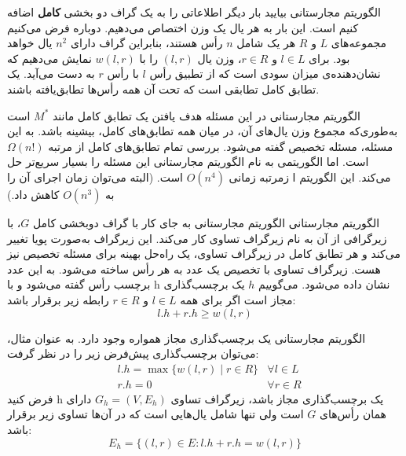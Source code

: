 \begin{itemframe}{الگوریتم مجارستانی}
\itm
بیایید بار دیگر اطلاعاتی را به یک گراف دو بخشی \textbf{کامل} اضافه کنیم است.
این بار به هر یال یک وزن اختصاص می‌دهیم.
دوباره فرض می‌کنیم مجموعه‌های $L$ و $R$ هر یک شامل $n$ رأس هستند، بنابراین گراف دارای
$n^2$
یال خواهد بود.
\itm
برای $l \in L$ و $r \in R$، وزن یال $(l, r)$ را با $w(l, r)$ نمایش می‌دهیم که نشان‌دهنده‌ی میزان سودی است که از تطبیق رأس $l$ با رأس $r$ به دست می‌آید.
\itm
یک تطابق کامل
 تطابقی است که تحت آن همه رأس‌ها تطابق‌یافته باشند.

\end{itemframe}


\begin{itemframe}{الگوریتم مجارستانی}
\itm
در این مسئله هدف یافتن یک تطابق کامل مانند
$M^*$
 است به‌طوری‌که مجموع وزن یال‌های آن، در میان همه تطابق‌های کامل، بیشینه باشد.
به این مسئله،‌ مسئله تخصیص
 گفته می‌شود.
\itm
بررسی تمام تطابق‌های کامل از مرتبه
$ \Omega (n!)$
است. اما الگوریتمی به نام الگوریتم مجارستانی
 این مسئله را بسیار سریع‌تر حل می‌کند.
\itm
این الگوریتم ا زمرتبه زمانی
$O(n^4)$
 است.
(البته می‌توان زمان اجرای آن را به
$O(n^3)$
 کاهش داد.)
\end{itemframe}


\begin{itemframe}{الگوریتم مجارستانی}
\itm
الگوریتم مجارستانی به جای کار با گراف دوبخشی کامل $G$، با زیرگرافی از آن به نام زیرگراف تساوی
کار می‌کند.
این زیرگراف به‌صورت پویا تغییر می‌کند و هر تطابق کامل در زیرگراف تساوی، یک راه‌حل بهینه برای مسئله تخصیص نیز هست.
\itm
زیرگراف تساوی با تخصیص یک عدد به هر رأس ساخته می‌شود. به این عدد برچسب رأس گفته می‌شود و با h نشان داده می‌شود.
\itm
می‌گوییم $h$ یک برچسب‌گذاری مجاز
است اگر برای همه $l \in L$ و $r \in R$ رابطه زیر برقرار باشد:
$$l.h + r.h \geq w(l, r)$$
\end{itemframe}


\begin{itemframe}{الگوریتم مجارستانی}
\itm
یک برچسب‌گذاری مجاز همواره وجود دارد. به عنوان مثال، می‌توان برچسب‌گذاری پیش‌فرض زیر را در نظر گرفت:
\begin{align*}
&l.h = \max \{ w(l, r) \mid r \in R \} &\forall l \in L\\
&r.h = 0 &\forall r \in R
\end{align*}
\itm
فرض کنید h یک برچسب‌گذاری مجاز باشد، زیرگراف تساوی $G_h = (V, E_h)$ دارای همان رأس‌های $G$ است ولی تنها شامل یال‌هایی است که در آن‌ها تساوی زیر برقرار باشد:
$$
E_h = \{ (l, r) \in E : l.h + r.h = w(l, r) \}
$$
\end{itemframe}


